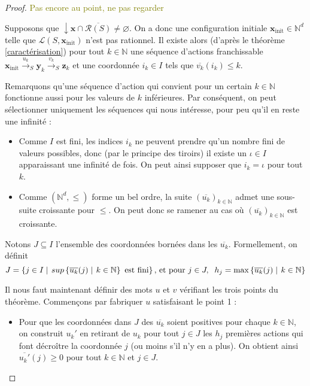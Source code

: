 \documentclass[a4paper,final]{article}
\theoremstyle{definition}
\let\leq\leqslant
\let\geq\geqslant
\newcommand{\alain}[1]{\textcolor{blue}{#1}}
\newcommand{\lucas}[1]{\textcolor{olive}{#1}}
\newcommand{\set}[2]{\left\{#1\mathrel{\left|\vphantom{#1}\vphantom{#2}\right.}#2\right\}}
\let\inter\cap
\let\vide\varnothing
\newcommand{\N}{\ensuremath{\mathbb{N}}}
\newcommand{\lang}{\ensuremath{\mathcal{L}}}
\newcommand{\trans}[2]{\ensuremath{\stackrel{#1}{\longrightarrow}_{#2}}}
\newcommand{\vect}[1]{\ensuremath{\mathbf{#1}}}
\newcommand{\xinit}{\ensuremath{\vect{x}_\text{init}}}
\newcommand{\valeur}[1]{\ensuremath{\overline{#1}}}
\newcommand{\inirat}{\mathcal{R}}
\begin{document}
\begin{proof}
\lucas{Pas encore au point, ne pas regarder}

Supposons que $\downarrow \vect{x} \inter \overline{\inirat(S)} \neq \vide$.
On a donc une configuration initiale $\xinit \in \N^d$ telle que $\lang(S,\xinit)$ n'est pas rationnel.
Il existe alors (d'après le théorème \ref{caractérisation}) pour tout $k\in\N$ une séquence d'actions franchissable 
$\xinit \trans{u_k}{S} \vect{y}_k \trans{v_k}{S} \vect{z}_k$
et une coordonnée $i_k \in I$ tels que $\valeur{v_k}(i_k) \leq k$.

Remarquons qu'une séquence d'action qui convient pour un certain $k\in\N$ fonctionne aussi pour les valeurs de $k$ inférieures.
Par conséquent, on peut sélectionner uniquement les séquences qui nous intéresse, pour peu qu'il  en reste une infinité :

\begin{itemize}
    \item Comme $I$ est fini, les indices $i_k$ ne peuvent prendre qu'un nombre fini de valeurs possibles, donc (par le principe des tiroirs) il existe un $\iota\in I$ apparaissant une infinité de fois.
    On peut ainsi supposer que $i_k = \iota$ pour tout $k$.
    
    \item Comme $(\N^d,\leq)$ forme un bel ordre, la suite $(\valeur{u_k})_{k\in\N}$ admet une sous-suite croissante pour $\leq$.
    On peut donc se ramener au cas où $(\valeur{u_k})_{k\in\N}$ est croissante.
\end{itemize}

Notons $J\subseteq I$ l'ensemble des coordonnées bornées dans les $\valeur{u_k}$.
Formellement, on définit 
$$J = \set{j\in I}{sup \set{\valeur{u_k}(j)}{k\in\N} \text{ est fini}}
\text{, et pour } j\in J,\hspace{2mm} h_j = \max \set{\valeur{u_k}(j)}{k\in\N}$$

Il nous faut maintenant définir des mots $u$ et $v$ vérifiant les trois points du théorème.
Commençons par fabriquer $u$ satisfaisant le point 1 :
\begin{itemize}
    \item Pour que les coordonnées dans $J$ des $\valeur{u_k}$ soient positives pour chaque $k\in\N$, 
    on construit $u_k'$ en retirant de $u_k$ pour tout $j\in J$ les $h_j$ premières actions qui font décroître la coordonnée $j$ (ou moins s'il n'y en a plus).
    On obtient ainsi $\valeur{u_k'}(j) \geq 0$ pour tout $k\in\N$ et $j\in J$.
    

\end{itemize}
\end{proof}
\end{document}
